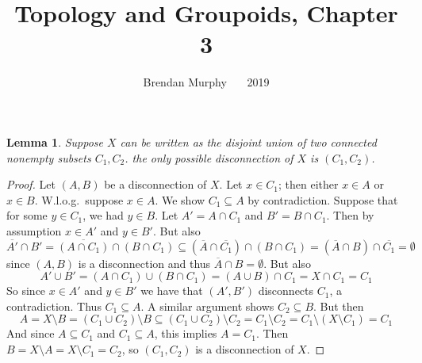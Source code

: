 \documentclass[12pt]{article}
\newtheorem{lemma}{Lemma}
\begin{document}
\title{\Huge Topology and Groupoids, Chapter 3}
\author{Brendan Murphy \ \textemdash\ \ 2019}
\date{\vspace{-7ex}}

\posttitle{\par\end{center}}\maketitle

\begin{lemma}
  Suppose $X$ can be written as the disjoint union of two connected nonempty subsets $C_1, C_2$. the only possible disconnection of $X$ is $(C_1, C_2)$.
\end{lemma}
\begin{proof}
  Let $(A, B)$ be a disconnection of $X$. Let $x \in C_1$; then either $x \in A$ or $x \in B$.  W.l.o.g.\ suppose $x \in A$. We show $C_1 \subseteq A$ by contradiction. Suppose that for some $y \in C_1$, we had $y \in B$. Let $A' = A \cap C_1$ and $B' = B \cap C_1$. Then by assumption $x \in A'$ and $y \in B'$. But also $\overline{A'} \cap B' = \overline{(A \cap C_1)} \cap (B \cap C_1) \subseteq (\overline{A} \cap \overline{C_1}) \cap (B \cap C_1) = (\overline{A} \cap B) \cap \overline{C_1} = \emptyset$ since $(A, B)$ is a disconnection and thus $\overline{A} \cap B = \emptyset$. But also $$A' \cup B' = (A \cap C_1) \cup (B \cap C_1) = (A \cup B) \cap C_1 = X \cap C_1 = C_1$$
  So since $x \in A'$ and $y \in B'$ we have that $(A', B')$ disconnects $C_1$, a contradiction. Thus $C_1 \subseteq A$. A similar argument shows $C_2 \subseteq B$. But then $$A = X \setminus B = (C_1 \cup C_2) \setminus B \subseteq (C_1 \cup C_2) \setminus C_2 = C_1 \setminus C_2 = C_1 \setminus (X \setminus C_1) = C_1$$
  And since $A \subseteq C_1$ and $C_1 \subseteq A$, this implies $A = C_1$. Then $B = X\setminus A = X \setminus C_1 = C_2$, so $(C_1, C_2)$ is a disconnection of $X$.
\end{proof}
\end{document}
